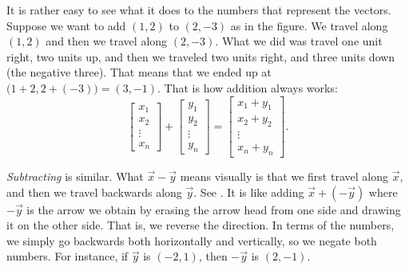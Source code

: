 \begin{myfig}
\capstart
{}
\caption{Adding the vectors $(1,2)$, drawn dotted, and $(2,-3)$, drawn dashed.  The
result, $(3,-1)$, is drawn as a solid arrow.\label{linalg-vecadd:fig}}
\end{myfig}

It is rather easy to see what it does to the numbers that represent the
vectors.  Suppose we want to add $(1,2)$ to $(2,-3)$ as in the figure.
We travel along $(1,2)$
and then we travel along $(2,-3)$.
What we did was travel one unit right, two units up, and then
we traveled two units right, and three units down (the negative three).  That
means that we ended up at $\bigl(1+2,2+(-3)\bigr) = (3,-1)$.
That is how addition always works:
\begin{equation*}
\begin{bmatrix}
x_{1} \\ x_2 \\ \vdots \\ x_n
\end{bmatrix} +
\begin{bmatrix}
y_{1} \\ y_2 \\ \vdots \\ y_n
\end{bmatrix} =
\begin{bmatrix}
x_1 + y_{1} \\ x_2+ y_2 \\ \vdots \\ x_n + y_n
\end{bmatrix} .
\end{equation*}

\emph{Subtracting} is similar.
What $\vec{x}- \vec{y}$ means visually is that
we first travel along $\vec{x}$, and then we travel
backwards along $\vec{y}$.
See .
It is like adding
$\vec{x}+ (- \vec{y})$ where $-\vec{y}$
is the arrow we obtain by erasing the arrow head
from one side and drawing it on the other side.
That is, we reverse the
direction.  In terms of the numbers, we simply go backwards both
horizontally and vertically,
so we negate both numbers.  For instance, if $\vec{y}$ is $(-2,1)$,
then $-\vec{y}$ is $(2,-1)$.


